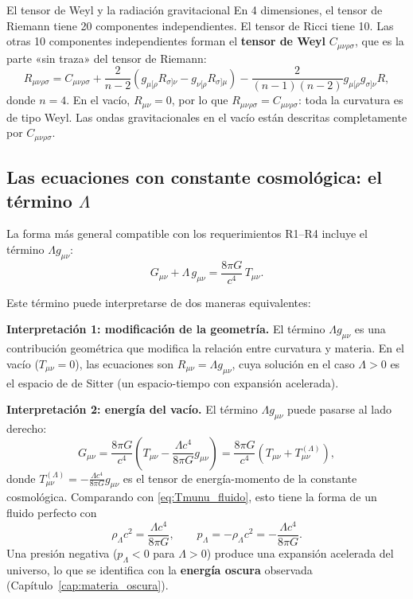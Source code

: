 \begin{observacion}{El tensor de Weyl y la radiación gravitacional}{}
En 4 dimensiones, el tensor de Riemann tiene 20 componentes independientes. El tensor de Ricci tiene 10. Las otras 10 componentes independientes forman el \textbf{tensor de Weyl} $C_{\mu\nu\rho\sigma}$, que es la parte «sin traza» del tensor de Riemann:
\begin{equation}
  R_{\mu\nu\rho\sigma} = C_{\mu\nu\rho\sigma} + \frac{2}{n-2}\left(g_{\mu[\rho}R_{\sigma]\nu} - g_{\nu[\rho}R_{\sigma]\mu}\right) - \frac{2}{(n-1)(n-2)}g_{\mu[\rho}g_{\sigma]\nu}R,
\end{equation}
donde $n=4$. En el vacío, $R_{\mu\nu} = 0$, por lo que $R_{\mu\nu\rho\sigma} = C_{\mu\nu\rho\sigma}$: toda la curvatura es de tipo Weyl. Las ondas gravitacionales en el vacío están descritas completamente por $C_{\mu\nu\rho\sigma}$.
\end{observacion}

\subsection{Las ecuaciones con constante cosmológica: el término $\Lambda$}

La forma más general compatible con los requerimientos R1--R4 incluye el término $\Lambda g_{\mu\nu}$:
\begin{equation}
  G_{\mu\nu} + \Lambda\,g_{\mu\nu} = \frac{8\pi G}{c^4}\,T_{\mu\nu}.
  \label{eq:EFE_Lambda}
\end{equation}

Este término puede interpretarse de dos maneras equivalentes:

\textbf{Interpretación 1: modificación de la geometría.} El término $\Lambda g_{\mu\nu}$ es una contribución geométrica que modifica la relación entre curvatura y materia. En el vacío ($T_{\mu\nu} = 0$), las ecuaciones son $R_{\mu\nu} = \Lambda g_{\mu\nu}$, cuya solución en el caso $\Lambda > 0$ es el espacio de de Sitter (un espacio-tiempo con expansión acelerada).

\textbf{Interpretación 2: energía del vacío.} El término $\Lambda g_{\mu\nu}$ puede pasarse al lado derecho:
\begin{equation}
  G_{\mu\nu} = \frac{8\pi G}{c^4}\left(T_{\mu\nu} - \frac{\Lambda c^4}{8\pi G}g_{\mu\nu}\right)
             = \frac{8\pi G}{c^4}\left(T_{\mu\nu} + T_{\mu\nu}^{(\Lambda)}\right),
\end{equation}
donde $T_{\mu\nu}^{(\Lambda)} = -\frac{\Lambda c^4}{8\pi G}g_{\mu\nu}$ es el tensor de energía-momento de la constante cosmológica. Comparando con \eqref{eq:Tmunu_fluido}, esto tiene la forma de un fluido perfecto con
\begin{equation}
  \rho_\Lambda c^2 = \frac{\Lambda c^4}{8\pi G},
  \qquad
  p_\Lambda = -\rho_\Lambda c^2 = -\frac{\Lambda c^4}{8\pi G}.
  \label{eq:rho_Lambda}
\end{equation}
Una presión negativa ($p_\Lambda < 0$ para $\Lambda > 0$) produce una expansión acelerada del universo, lo que se identifica con la \textbf{energía oscura} observada (Capítulo~\ref{cap:materia_oscura}).

